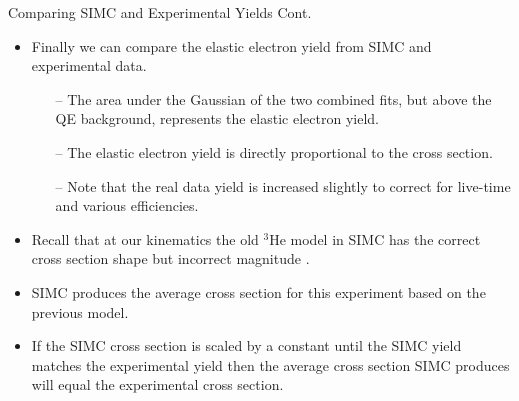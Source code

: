 \documentclass[10pt]{beamer}
\begin{document}
\begin{frame}[fragile]{Comparing SIMC and Experimental Yields Cont.}

	\begin{itemize}
		\item Finally we can compare the elastic electron yield from SIMC and experimental data.
			\begin{itemize}
				\pause
				\item[--] The \alert{area under the Gaussian} of the two combined fits, but above the QE background, \alert{represents the elastic electron yield}.
				\pause
				\item[--] The \alert{elastic electron yield is directly proportional to the cross section}.
				\pause
				\item[--] Note that the real data yield is increased slightly to correct for live-time and various efficiencies.
			\end{itemize}
			\pause
			\item Recall that at our kinematics the old $^3$He model in SIMC has the \alert{correct cross section shape} but \alert{incorrect magnitude} \cite{Article:Amroun}.
			\item \alert{SIMC produces the average cross section} for this experiment based on the previous model.
			\pause
			\item If the SIMC cross section is scaled by a constant until the SIMC yield matches the experimental yield then the average cross section SIMC produces will equal the experimental cross section. 
	\end{itemize}

\end{frame}
\end{document}
